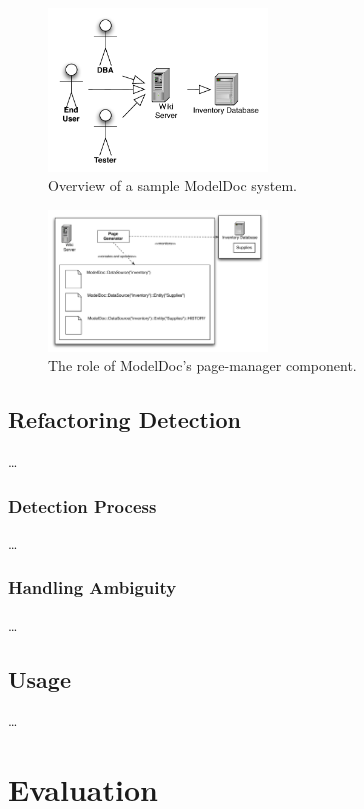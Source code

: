 \documentclass{acm_proc_article-sp}
\begin{document}
\begin{figure}[b]
\centering
\includegraphics[width=220px]{Overview.pdf}
\caption{Overview of a sample ModelDoc system.}
\end{figure}

\begin{figure}
\centering
\includegraphics[width=220px]{PageManager.pdf}
\caption{The role of ModelDoc's page-manager component.}
\end{figure}

\subsection{Refactoring Detection}

\ldots

\subsubsection{Detection Process}

\ldots

\subsubsection{Handling Ambiguity}

\ldots

\subsection{Usage}

\ldots

\section{Evaluation}
\end{document}

